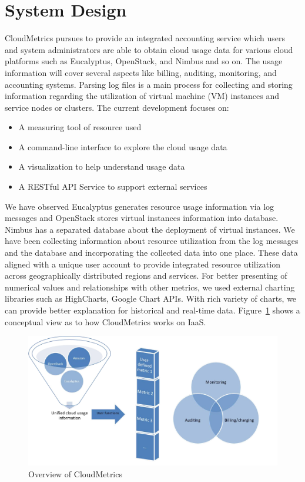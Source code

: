 \documentclass{sig-alternate-05-2015}
\begin{document}
\section{System Design} \label{S:design}

CloudMetrics pursues to provide an integrated accounting service which users and system administrators are able to obtain cloud usage data for various cloud platforms such as Eucalyptus, OpenStack, and Nimbus and so on. The usage information will cover several aspects like billing, auditing, monitoring, and accounting systems. Parsing log files is a main process for collecting and storing information regarding the utilization of virtual machine (VM) instances and service nodes or clusters. The current development focuses on:

\begin{itemize}
 \item A measuring tool of resource used
 \item A command-line interface to explore the cloud usage data
 \item A visualization to help understand usage data
 \item A RESTful API Service to support external services
\end{itemize}

We have observed Eucalyptus generates resource usage information via log messages and OpenStack stores virtual instances information into database. Nimbus has a separated database about the deployment of virtual instances. We have been collecting information about resource utilization from the log messages and the database and incorporating the collected data into one place. These data aligned with a unique user account to provide integrated resource utilization across geographically distributed regions and services. For better presenting of numerical values and relationships with other metrics, we used external charting libraries such as HighCharts, Google Chart APIs. With rich variety of charts, we can provide better explanation for historical and real-time data. Figure~\ref{F:fig1} shows a conceptual view as to how CloudMetrics works on IaaS.

\begin{figure}[h!] 
  \centering 
    \includegraphics[width=1.0\columnwidth]{images/Picture1.pdf} 
  \caption{Overview of CloudMetrics}\label{F:fig1} 
\end{figure} 
\end{document}
